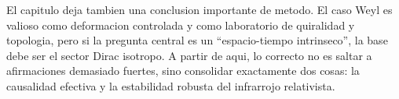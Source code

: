 El capitulo deja tambien una conclusion importante de metodo. El caso Weyl es valioso como deformacion controlada y como laboratorio de quiralidad y topologia, pero si la pregunta central es un \enquote{espacio-tiempo intrinseco}, la base debe ser el sector Dirac isotropo. A partir de aqui, lo correcto no es saltar a afirmaciones demasiado fuertes, sino consolidar exactamente dos cosas: la causalidad efectiva y la estabilidad robusta del infrarrojo relativista.
